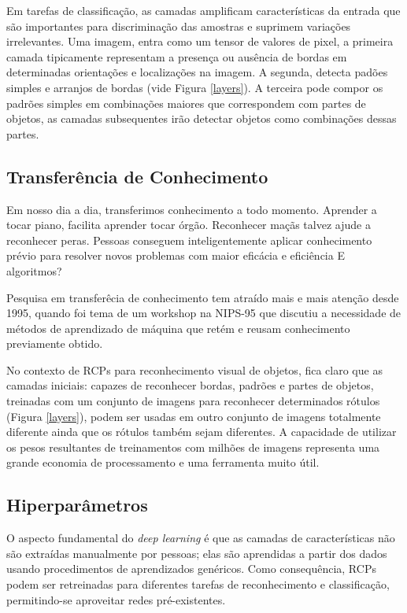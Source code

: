 \documentclass[conference]{IEEEtran}
\begin{document}
Em tarefas de classificação, as camadas amplificam características da entrada que são importantes para discriminação das amostras e suprimem variações irrelevantes. Uma imagem, entra como um tensor de valores de pixel,  a primeira camada tipicamente representam a presença ou ausência de bordas em determinadas orientações e localizações na imagem. A segunda, detecta padões simples e arranjos de bordas (vide Figura \ref{layers}). A terceira pode compor os padrões simples em combinações maiores que correspondem com partes de objetos, as camadas subsequentes irão detectar objetos como combinações dessas partes\cite{hinton}.


\subsection{Transferência de Conhecimento}
Em nosso dia a dia, transferimos conhecimento a todo momento. Aprender a tocar piano, facilita aprender tocar órgão. Reconhecer maçãs talvez ajude a reconhecer peras. Pessoas conseguem inteligentemente aplicar conhecimento prévio para resolver novos problemas com maior eficácia e eficiência\cite{sinno} E algoritmos?

Pesquisa em transferêcia de conhecimento tem atraído mais e mais atenção desde 1995, quando foi tema de  um workshop na NIPS-95 que discutiu a necessidade de métodos de aprendizado de máquina que retém e reusam conhecimento previamente obtido\cite{sinno}. 

No contexto de RCPs para reconhecimento visual de objetos, fica claro que as camadas iniciais: capazes de reconhecer bordas, padrões e partes de objetos, treinadas com um conjunto de imagens para reconhecer determinados rótulos (Figura \ref{layers}), podem ser usadas em outro conjunto de imagens totalmente diferente ainda que os rótulos também sejam diferentes. A capacidade de utilizar os pesos resultantes de treinamentos com milhões de imagens representa uma grande economia de processamento e uma ferramenta muito útil. 


\subsection{Hiperparâmetros}
O aspecto fundamental do \textit{deep learning} é que as camadas de características não são extraídas manualmente por pessoas; elas são aprendidas a partir dos dados usando procedimentos de aprendizados genéricos. Como consequência, RCPs podem ser retreinadas para diferentes tarefas de reconhecimento e classificação, permitindo-se aproveitar redes pré-existentes. 
\end{document}
